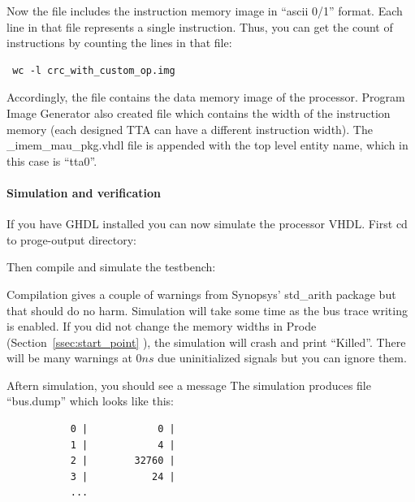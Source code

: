 \documentclass[twoside]{tceusermanual}
\begin{document}
Now the file  includes the instruction memory
image in ``ascii 0/1'' format. Each line in that file represents a single
instruction. Thus, you can get the count of instructions by counting the
lines in that file:

\begin{verbatim}
 wc -l crc_with_custom_op.img
\end{verbatim}


Accordingly, the file  contains the data
memory image of the processor. Program Image Generator also created file
 which contains the 
width of the instruction memory (each designed TTA can have a different 
instruction width). The \_imem\_mau\_pkg.vhdl file is appended with the top
level entity name, which in this case is ``tta0''.

\paragraph{Simulation and verification}

If you have GHDL installed you can now simulate the processor VHDL. First
cd to proge-output directory:


Then compile and simulate the testbench:



Compilation gives a couple of warnings from Synopsys' std\_arith
package but that should do no harm.  Simulation will take some time as
the bus trace writing is enabled. If you did not change the memory
widths in Prode (Section~\ref{ssec:start_point} ), the simulation will crash and print
``Killed''. There will be many warnings at $0 ns$ due uninitialized
signals but you can ignore them. 

Aftern simulation, you should see a message
The simulation produces file ``bus.dump'' which looks like this:
\begin{verbatim}
           0 |            0 | 
           1 |            4 | 
           2 |        32760 | 
           3 |           24 | 
           ...
\end{verbatim}
\end{document}
